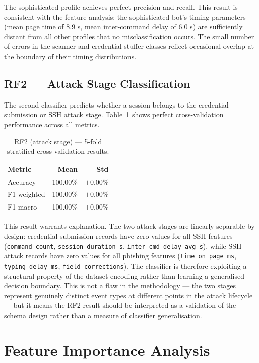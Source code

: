 The sophisticated profile achieves perfect precision and recall. This
result is consistent with the feature analysis: the sophisticated bot's
timing parameters (mean page time of 8.9 s, mean inter-command delay of
6.0 s) are sufficiently distant from all other profiles that no
misclassification occurs. The small number of errors in the scanner and
credential stuffer classes reflect occasional overlap at the boundary
of their timing distributions.

\subsection{RF2 — Attack Stage Classification}

The second classifier predicts whether a session belongs to the
credential submission or SSH attack stage.
Table~\ref{tab:rf2_cv} shows perfect cross-validation performance
across all metrics.

\begin{table}[h]
\centering
\caption{RF2 (attack stage) — 5-fold stratified cross-validation results.}
\label{tab:rf2_cv}
\begin{tabular}{lrr}
\hline
\textbf{Metric} & \textbf{Mean} & \textbf{Std} \\
\hline
Accuracy    & 100.00\% & $\pm$0.00\% \\
F1 weighted & 100.00\% & $\pm$0.00\% \\
F1 macro    & 100.00\% & $\pm$0.00\% \\
\hline
\end{tabular}
\end{table}

This result warrants explanation. The two attack stages are linearly
separable by design: credential submission records have zero values for
all SSH features (\texttt{command\_count}, \texttt{session\_duration\_s},
\texttt{inter\_cmd\_delay\_avg\_s}), while SSH attack records have zero
values for all phishing features (\texttt{time\_on\_page\_ms},
\texttt{typing\_delay\_ms}, \texttt{field\_corrections}). The classifier
is therefore exploiting a structural property of the dataset encoding
rather than learning a generalised decision boundary. This is not a
flaw in the methodology — the two stages represent genuinely distinct
event types at different points in the attack lifecycle — but it means
the RF2 result should be interpreted as a validation of the schema
design rather than a measure of classifier generalisation.

\section{Feature Importance Analysis}

